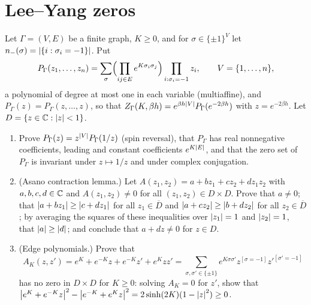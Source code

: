 \section{Lee--Yang zeros}

\begin{exercise}
Let $\Gamma=(V,E)$ be a finite graph, $K\ge0$, and for $\sigma\in\{\pm1\}^V$
let $n_-(\sigma)=\left\lvert \{i:\sigma_i=-1\}\right\rvert$.  Put
\[
 P_\Gamma(z_1,\dots,z_n)=\sum_{\sigma}\Bigl(\prod_{ij\in E}e^{K\sigma_i\sigma_j}\Bigr)\prod_{i:\sigma_i=-1}z_i ,
 \qquad V=\{1,\dots,n\},
\]
a polynomial of degree at most one in each variable (multiaffine), and
$P_\Gamma(z)=P_\Gamma(z,\dots,z)$, so that
$Z_\Gamma(K,\beta h)=e^{\beta h\left\lvert V\right\rvert}P_\Gamma(e^{-2\beta h})$ with $z=e^{-2\beta h}$.
Let $D=\{z\in\mathbb C:\left\lvert z\right\rvert<1\}$.
\begin{enumerate}[label=(\alph*)]
\item Prove $P_\Gamma(z)=z^{\left\lvert V\right\rvert}P_\Gamma(1/z)$ (spin reversal), that
$P_\Gamma$ has real nonnegative coefficients, leading and constant
coefficients $e^{K\left\lvert E\right\rvert}$, and that the zero set of $P_\Gamma$ is invariant
under $z\mapsto1/z$ and under complex conjugation.
\item (Asano contraction lemma.)  Let $A(z_1,z_2)=a+bz_1+cz_2+dz_1z_2$ with
$a,b,c,d\in\mathbb C$ and $A(z_1,z_2)\ne0$ for all $(z_1,z_2)\in D\times D$.  Prove
that $a\ne0$; that $\left\lvert a+bz_1\right\rvert\ge\left\lvert c+dz_1\right\rvert$ for all $z_1\in\overline D$
and $\left\lvert a+cz_2\right\rvert\ge\left\lvert b+dz_2\right\rvert$ for all $z_2\in\overline D$; by
averaging the squares of these inequalities over $\left\lvert z_1\right\rvert=1$ and
$\left\lvert z_2\right\rvert=1$, that $\left\lvert a\right\rvert\ge\left\lvert d\right\rvert$; and conclude that $a+dz\ne0$ for
$z\in D$.
\item (Edge polynomials.)  Prove that
\[
 A_K(z,z')=e^{K}+e^{-K}z+e^{-K}z'+e^{K}zz'
 =\sum_{\sigma,\sigma'\in\{\pm1\}}e^{K\sigma\sigma'}
              z^{[\sigma=-1]}z'^{[\sigma'=-1]}
\]
has no zero in $D\times D$ for $K\ge0$: solving $A_K=0$ for $z'$, show that
$\left\lvert e^K+e^{-K}z\right\rvert^2-\left\lvert e^{-K}+e^Kz\right\rvert^2=2\sinh(2K)(1-\left\lvert z\right\rvert^2)\ge0$.
\end{enumerate}
\end{exercise}

